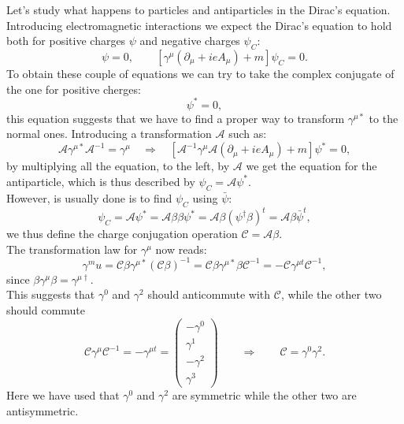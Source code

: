 Let's study what happens to particles and antiparticles in the Dirac's equation. Introducing electromagnetic interactions we expect the Dirac's equation to hold both for positive charges $\psi$ and negative charges $\psi_C$:
\begin{equation*}
    [\gamma^\mu(\partial_\mu-ieA_\mu)+m]\psi=0,\qquad  [\gamma^\mu(\partial_\mu+ieA_\mu)+m]\psi_C=0.
\end{equation*}
To obtain these couple of equations we can try to take the complex conjugate of the one for positive cherges:
\begin{equation*}
    [\gamma^{\mu*}(\partial_\mu+ieA_\mu)+m]\psi^*=0,
\end{equation*}
this equation suggests that we have to find a proper way to transform $\gamma^{\mu*}$ to the normal ones. Introducing a transformation $\mathcal{A} $ such as:
\begin{equation*}
   \mathcal{A} \gamma^{\mu*}\mathcal{A} ^{-1}=\gamma^\mu\quad\Rightarrow\quad[\mathcal{A} ^{-1}\gamma^{\mu}\mathcal{A} (\partial_\mu+ieA_\mu)+m]\psi^*=0,
\end{equation*}
by multiplying all the equation, to the left, by $\mathcal{A} $ we get the equation for the antiparticle, which is thus described by $\psi_C=\mathcal{A} \psi^*$.\\
However, is usually done is to find $\psi_C$ using $\bar\psi$:
\begin{equation*}
    \psi_C=\mathcal{A} \psi^*=\mathcal{A}\beta\beta \psi^*=\mathcal{A}\beta(\psi^\dagger\beta)^t=\mathcal{A}\beta\bar\psi^t, 
\end{equation*}
we thus define the charge conjugation operation $\mathcal{C} =\mathcal{A} \beta$.\\
The transformation law for $\gamma^\mu$ now reads:
\begin{equation*}
    \gamma^mu=\mathcal{C} \beta\gamma^{\mu*}(\mathcal{C} \beta)^{-1}=\mathcal{C} \beta\gamma^{\mu*}\beta\mathcal{C} ^{-1}=-\mathcal{C} \gamma^{\mu t}\mathcal{C} ^{-1},
\end{equation*}
since $\beta\gamma^{\mu}\beta=\gamma^{\mu\dagger}$.\\
This suggests that $\gamma^0$ and $\gamma^2$ should anticommute with $\mathcal{C}$, while the other two should commute
\begin{equation*}
    \mathcal{C} \gamma^\mu\mathcal{C} ^{-1}=-\gamma^{\mu t}=\begin{pmatrix}
        -\gamma^0\\\gamma^1\\-\gamma^2\\\gamma^3
    \end{pmatrix}\qquad\Rightarrow\qquad\mathcal{C} =\gamma^0\gamma^2.
\end{equation*}
Here we have used that $\gamma^0$ and $\gamma^2$ are symmetric while the other two are antisymmetric.\\

